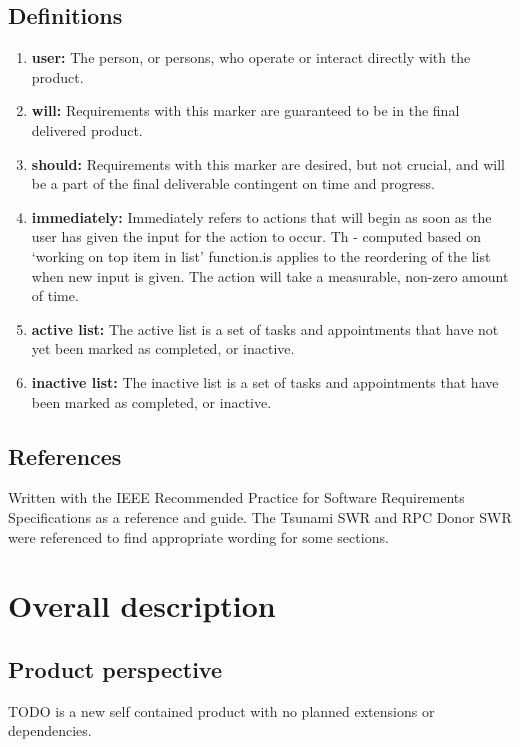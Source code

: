 \documentclass[12pt,a4paper]{article}
\begin{document}
\subsection{Definitions}
\begin{enumerate}
\item \textbf{user:} The person, or persons, who operate or interact directly with the product.
\item \textbf{will:} Requirements with this marker are guaranteed to be in the final delivered product.
\item \textbf{should:} Requirements with this marker are desired, but not crucial, and will
be a part of the final deliverable contingent on time and progress.
\item \textbf{immediately:} Immediately refers to actions that will begin as soon as the user has given the input for the action to occur.  Th - computed based on `working on top item in list' function.is applies to the reordering of the list when new input is given.  The action will take a measurable, non-zero amount of time.
\item \textbf{active list:} The active list is a set of tasks and appointments that have not yet been marked as completed, or inactive.
\item \textbf{inactive list:} The inactive list is a set of tasks and appointments that have been marked as completed, or inactive.
\end{enumerate}

\subsection{References}
Written with the IEEE Recommended Practice for Software Requirements Specifications as a reference and guide. The Tsunami SWR and RPC Donor SWR were referenced to find appropriate wording for some sections.

\section{Overall description}
\subsection{Product perspective}
TODO is a new self contained product with no planned extensions or dependencies.
\end{document}
